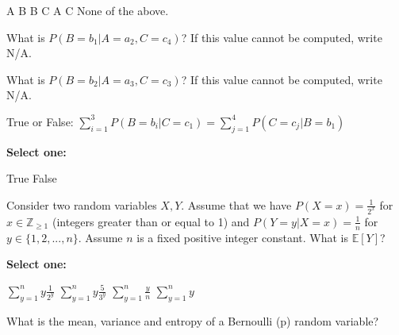 \documentclass[11pt,addpoints,answers]{exam}
\numberwithin{equation}{section} %
\numberwithin{figure}{section} %
\numberwithin{table}{section} %
\begin{document}
\begin{questions}
\begin{checkboxes}
{        \choice A  B
        \choice B  C
        \choice A  C
        \choice None of the above.
    }
    
    \end{checkboxes}
    
    

    \question[2] What is $P(B=b_1 | A = a_2, C = c_4)$? If this value cannot be computed, write N/A.
    
    \begin{tcolorbox}[fit,height=1cm, width=2cm, blank, borderline={1pt}{-2pt},nobeforeafter]
    \end{tcolorbox}
    
    
    
    \question[2] What is $P(B=b_2 | A = a_3, C = c_3)$? If this value cannot be computed, write N/A.
    
    \begin{tcolorbox}[fit,height=1cm, width=2cm, blank, borderline={1pt}{-2pt},nobeforeafter]
    \end{tcolorbox}
    
    
    
    \question[2] True or False: $\sum_{i=1}^3 P(B=b_i|C=c_1) = \sum_{j=1}^4 P(C=c_j|B=b_1)$
    
    \textbf{Select one:}
    \begin{checkboxes}
        \choice True
        \choice False
    \end{checkboxes}
    
    
        
    \question[2] Consider two random variables $X, Y$. Assume that we have $P(X=x) = \frac{1}{2^x}$ for $x \in \mathbb{Z}_{\geq 1}$ (integers greater than or equal to 1) and $P(Y=y|X=x) = \frac{1}{n}$ for $y \in \{1,2,...,n\}$. Assume $n$ is a fixed positive integer constant. What is $\mathbb{E}[Y]$? 
    
    \textbf{Select one:}
    \begin{checkboxes}
        \choice $\sum_{y=1}^n y \frac{1}{2^y}$
        \choice $\sum_{y=1}^n y \frac{5}{3^y}$
        \choice $\sum_{y=1}^n \frac{y}{n}$
        \choice $\sum_{y=1}^n y$
    \end{checkboxes}
    
    
\clearpage
    \question[1] What is the mean, variance and entropy of a Bernoulli (p) random variable?
    

\end{questions}
\end{document}
